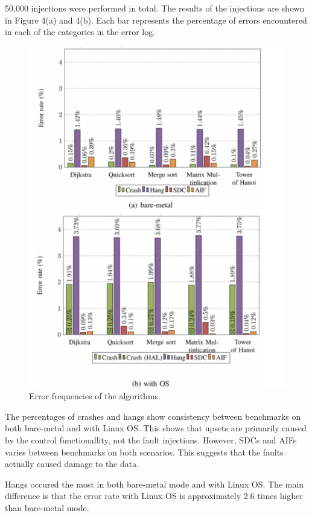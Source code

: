 \documentclass[conference]{IEEEtran}
\begin{document}
50,000 injections were performed in total. The results of the injections are shown in Figure 4(a) and 4(b). Each bar represents the percentage 
of errors encountered in each of the categories in the error log. 
\begin{figure}[ht]
    \centering
    \includegraphics[scale = 0.2]{results.jpg}
    \caption{Error frequencies of the algorithms.}
\end{figure}
The percentages of crashes and hangs show consistency between benchmarks on both bare-metal and with Linux OS. This shows that upsets are 
primarily caused by the control functionallity, not the fault injections. However, SDCs and AIFs varies between benchmarks on both scenarios. 
This suggests that the faults actually caused damage to the data. 

Hangs occured the most in both bare-metal mode and with Linux OS. The main difference is that the error rate with Linux OS is approximately
2.6 times higher than bare-metal mode. 
\end{document}
